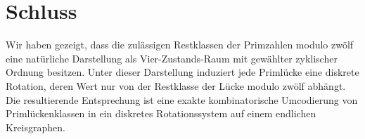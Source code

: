 \documentclass[11pt]{article}
\theoremstyle{definition}
\begin{document}
\section{Schluss}

Wir haben gezeigt, dass die zul\"assigen Restklassen der Primzahlen modulo zw\"olf eine nat\"urliche Darstellung als Vier-Zustands-Raum mit gew\"ahlter zyklischer Ordnung besitzen.
Unter dieser Darstellung induziert jede Priml\"ucke eine diskrete Rotation, deren Wert nur von der Restklasse der L\"ucke modulo zw\"olf abh\"angt.
Die resultierende Entsprechung ist eine exakte kombinatorische Umcodierung von Priml\"uckenklassen in ein diskretes Rotationssystem auf einem endlichen Kreisgraphen.
\end{document}
